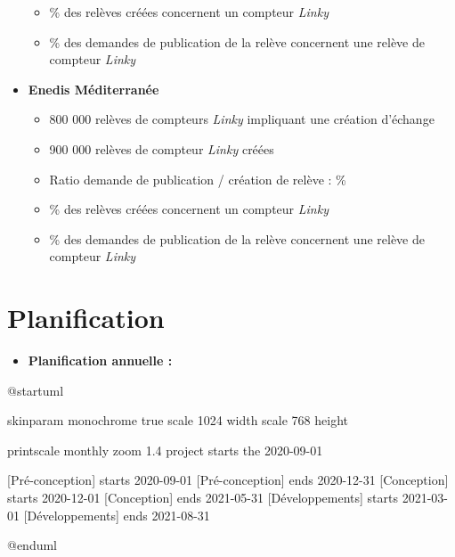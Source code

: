 \documentclass[a4paper, 12pt]{report}
\begin{document}
\begin{itemize}
\begin{itemize}
    \item \approx{}\% des relèves créées concernent un compteur \textit{Linky}
    \item \approx{}\% des demandes de publication de la relève concernent une relève de compteur \textit{Linky}
  \end{itemize}
  \item \textbf{Enedis Méditerranée}
  \begin{itemize}
    \item \approx{} 800 000 relèves de compteurs \textit{Linky} impliquant une création d'échange
    \item \approx{} 900 000 relèves de compteur \textit{Linky} créées
    \item Ratio demande de publication / création de relève : \approx{}\%
    \item \approx{}\% des relèves créées concernent un compteur \textit{Linky}
    \item \approx{}\% des demandes de publication de la relève concernent une relève de compteur \textit{Linky}
  \end{itemize}
\end{itemize}


\chapter{Planification}
\label{appendix:planification}

\begin{itemize}
  \item \textbf{Planification annuelle :}\\
\end{itemize}

\begin{center}
  \begin{plantuml}
    @startuml

    skinparam monochrome true
    scale 1024 width
    scale 768 height

    printscale monthly zoom 1.4
    project starts the 2020-09-01

    [Pré-conception] starts 2020-09-01
    [Pré-conception] ends 2020-12-31
    [Conception] starts 2020-12-01
    [Conception] ends 2021-05-31
    [Développements] starts 2021-03-01
    [Développements] ends 2021-08-31

    @enduml
  \end{plantuml}
\end{center}
\vspace{1cm}
\end{document}
